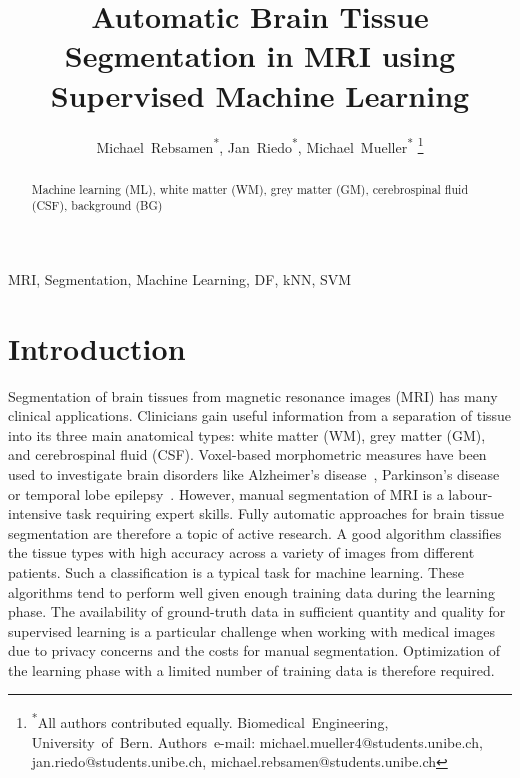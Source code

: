 \documentclass[journal]{IEEEtran}
\begin{document}
\title{Automatic Brain Tissue Segmentation in MRI using Supervised Machine Learning}

\author{Michael~Rebsamen\textsuperscript{*},
        Jan~Riedo\textsuperscript{*},
        Michael~Mueller\textsuperscript{*}
\thanks{\textsuperscript{*}All authors contributed equally. Biomedical~Engineering, University~of~Bern. Authors~e-mail: michael.mueller4@students.unibe.ch, jan.riedo@students.unibe.ch, michael.rebsamen@students.unibe.ch}}
{}%
\maketitle

\begin{abstract}
Machine learning (ML), white matter (WM), grey matter (GM), cerebrospinal fluid (CSF), background (BG)
\end{abstract}
\begin{IEEEkeywords}
MRI, Segmentation, Machine Learning, DF, kNN, SVM
\end{IEEEkeywords}


\section{Introduction}\label{s.introduction}
Segmentation of brain tissues from magnetic resonance images (MRI) has many clinical applications. Clinicians gain useful information from a separation of tissue into its three main anatomical types: white matter (WM), grey matter (GM), and cerebrospinal fluid (CSF). Voxel-based morphometric measures have been used to investigate brain disorders like Alzheimer’s disease~\cite{busatto2003voxel}, Parkinson's disease~\cite{price2004voxel} or temporal lobe epilepsy~\cite{rummel2017personalized}. However, manual segmentation of MRI is a labour-intensive task requiring expert skills. Fully automatic approaches for brain tissue segmentation are therefore a topic of active research. A good algorithm classifies the tissue types with high accuracy across a variety of images from different patients. Such a classification is a typical task for machine learning. These algorithms tend to perform well given enough training data during the learning phase. The availability of ground-truth data in sufficient quantity and quality for supervised learning is a particular challenge when working with medical images due to privacy concerns and the costs for manual segmentation. Optimization of the learning phase with a limited number of training data is therefore required.
\end{document}
